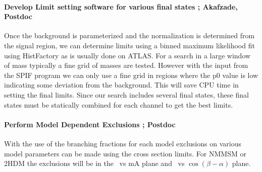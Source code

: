 
\paragraph{Develop Limit setting software for various final states ;  Akafzade, Postdoc} %
Once the background is parameterized and the normalization is determined from the signal region, we can determine limits using a binned maximum likelihood fit using  HistFactory as is usually done on ATLAS. 
For a search in a large window of mass typically a fine grid of masses are tested.  However with the input from the SPIF program we can only use a fine grid in regions where the p0 value is low indicating some deviation
from the background.  This will save CPU time in setting the final limits. 
Since our search includes several final states, these final states must be statically combined for each channel to get the best limits. 

\paragraph{Perform Model Dependent Exclusions ;  Postdoc} %
With the use of the branching fractions for each model exclusions on various model parameters can be made using the cross section limits. For NMMSM or 2HDM the exclusions will be in the \tanb\ vs mA plane and \tanb\ vs $\cos(\beta-\alpha)$ plane.

